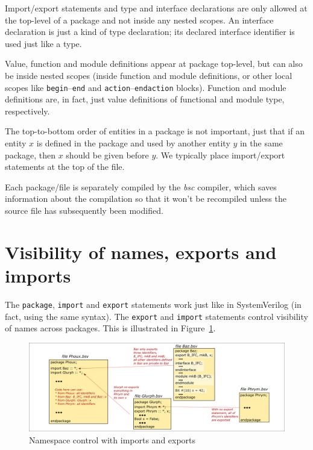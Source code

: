 Import/export statements and type and interface declarations are only
allowed at the top-level of a package and not inside any nested
scopes.  An interface declaration is just a kind of type declaration;
its declared interface identifier is used just like a type.

Value, function and module definitions appear at package top-level,
but can also be inside nested scopes (inside function and module
definitions, or other local scopes like \verb|begin|--\verb|end| and
\verb|action|--\verb|endaction| blocks).  Function and module
definitions are, in fact, just value definitions of functional and
module type, respectively.

The top-to-bottom order of entities in a package is not important,
just that if an entity $x$ is defined in the package and used by
another entity $y$ in the same package, then $x$ should be given
before $y$.  We typically place import/export statements at the top of
the file.

Each package/file is separately compiled by the \emph{bsc} compiler,
which saves information about the compilation so that it won't be
recompiled unless the source file has subsequently been modified.


\section{Visibility of names, exports and imports}

The \verb|package|, \verb|import| and \verb|export| statements work
just like in SystemVerilog (in fact, using the same syntax).  The
\verb|export| and \verb|import| statements control visibility of names
across packages.  This is illustrated in Figure~\ref{Fig_BSV_namespace_control}.
\begin{figure}[htbp]
  \centerline{\includegraphics[width=6in,angle=0]{Figures/Fig_BSV_namespace_control}}
  \caption{\label{Fig_BSV_namespace_control}
           Namespace control with imports and exports}
\end{figure}

